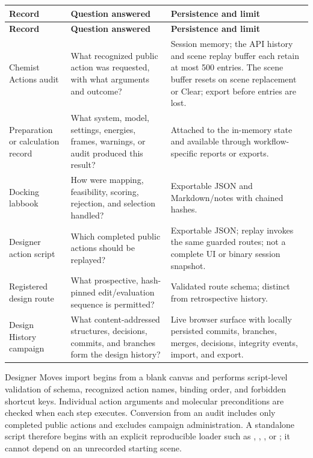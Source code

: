 \documentclass[11pt]{article}
\begin{document}
\begingroup
\footnotesize
\begin{longtable}{@{}p{1.23in}p{2.76in}p{2.61in}@{}}
\toprule
\textbf{Record} & \textbf{Question answered} & \textbf{Persistence and limit}\\
\midrule
\endfirsthead
\toprule
\textbf{Record} & \textbf{Question answered} & \textbf{Persistence and limit}\\
\midrule
\endhead
Chemist Actions audit & What recognized public action was requested, with what arguments and outcome? & Session memory; the API history and scene replay buffer each retain at most 500 entries. The scene buffer resets on scene replacement or Clear; export before entries are lost.\\
Preparation or calculation record & What system, model, settings, energies, frames, warnings, or audit produced this result? & Attached to the in-memory state and available through workflow-specific reports or exports.\\
Docking labbook & How were mapping, feasibility, scoring, rejection, and selection handled? & Exportable JSON and Markdown/notes with chained hashes.\\
Designer action script & Which completed public actions should be replayed? & Exportable JSON; replay invokes the same guarded routes; not a complete UI or binary session snapshot.\\
Registered design route & What prospective, hash-pinned edit/evaluation sequence is permitted? & Validated route schema; distinct from retrospective history.\\
Design History campaign & What content-addressed structures, decisions, commits, and branches form the design history? & Live browser surface with locally persisted commits, branches, merges, decisions, integrity events, import, and export.\\
\bottomrule
\end{longtable}
\endgroup


Designer Moves import begins from a blank canvas and performs script-level validation of schema, recognized action names, binding order, and forbidden shortcut keys. Individual action arguments and molecular preconditions are checked when each step executes. Conversion from an audit includes only completed public actions and excludes campaign administration. A standalone script therefore begins with an explicit reproducible loader such as , , , or ; it cannot depend on an unrecorded starting scene.
\end{document}
